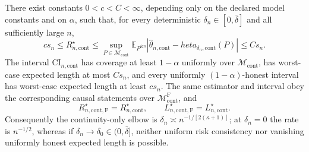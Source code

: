 There exist constants \(0<c<C<\infty\), depending only on the declared model constants and on \(\alpha\), such that, for every deterministic \(\delta_n\in[0,\bar\delta]\) and all sufficiently large \(n\),
\[
 c s_n\leq R_{n,\mathrm{cont}}^\star
 \leq\sup_{P\in\mathcal M_{\mathrm{cont}}}
 \mathbb E_{P^{\otimes n}}|\widehat\theta_{n,\mathrm{cont}}-  heta_{\delta_n,\mathrm{cont}}(P)|
 \leq Cs_n.
\]
The interval \(\mathrm{CI}_{n,\mathrm{cont}}\) has coverage at least \(1-\alpha\) uniformly over \(\mathcal M_{\mathrm{cont}}\), has worst-case expected length at most \(Cs_n\), and every uniformly \((1-\alpha)\)-honest interval has worst-case expected length at least \(cs_n\).  The same estimator and interval obey the corresponding causal statements over \(\mathcal M_{\mathrm{cont}}^{\mathrm F}\), and
\[
 R_{n,\mathrm{cont},\mathrm F}^\star=R_{n,\mathrm{cont}}^\star,
 \qquad
 L_{n,\mathrm{cont},\mathrm F}^\star=L_{n,\mathrm{cont}}^\star.
\]
Consequently the continuity-only elbow is \(\delta_n\asymp n^{-1/[2(\kappa+1)]}\); at \(\delta_n=0\) the rate is \(n^{-1/2}\), whereas if \(\delta_n\to\delta_0\in(0,\bar\delta]\), neither uniform risk consistency nor vanishing uniformly honest expected length is possible.